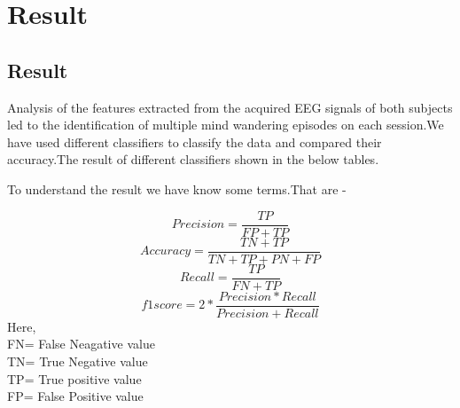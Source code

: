 
\chapter{Result} %

\label{Chapter5} %





\section{Result}
Analysis of the features extracted from the acquired EEG signals of both subjects led to the identification of multiple mind wandering episodes on each session.We have used different classifiers to classify the data and compared their accuracy.The result of different classifiers shown in the below tables.

To understand the result we have know some terms.That are -

\begin{equation}
    Precision = \frac{TP}{FP + TP}
\end{equation}
\begin{equation}
    Accuracy = \frac{TN + TP }{TN+TP+PN+FP}
\end{equation}
\begin{equation}
    Recall = \frac{TP}{ FN + TP}
\end{equation}
\begin{equation}
    f1 score = 2 * \frac{Precision * Recall}{ Precision + Recall }
\end{equation}
Here,\\
FN= False Neagative value \\
TN= True Negative value \\
TP= True positive value \\
FP= False Positive value \\

